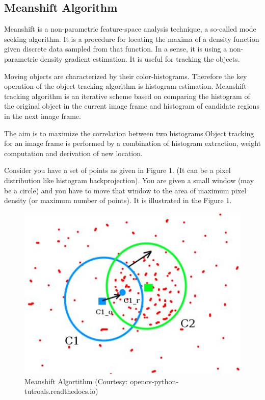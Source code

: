 \documentclass[11pt,a4paper]{article}
\begin{document}
		\subsection{Meanshift Algorithm}
			Meanshift is a non-parametric feature-space analysis technique, a so-called mode seeking algorithm. It is a procedure for locating the maxima of a density function given discrete data sampled from that function. In a sense, it is using a non-parametric density gradient estimation. It is useful for tracking the objects.
			
			Moving objects are characterized by their color-histograms. Therefore the key operation of the object tracking algorithm is histogram estimation. Meanshift tracking algorithm is an iterative scheme based on comparing the histogram of the original object in the current image frame and histogram of candidate regions in the next image frame. 
			 
			The aim is to maximize the correlation between two histograms.Object tracking for an image frame is performed by a combination of histogram extraction, weight computation and derivation of new location. 
			
			Consider you have a set of points as given in Figure 1. (It can be a pixel distribution like histogram backprojection). You are given a small window (may be a circle) and you have to move that window to the area of maximum pixel density (or maximum number of points). It is illustrated in the Figure 1.
			\begin{figure}[h!]
				\includegraphics[scale=0.5 ]{../Images/meanshift.jpg}
				\centering
				\caption{Meanshift Algortithm (Courtesy: opencv-python-tutroals.readthedocs.io)}
			\end{figure}
			
\end{document}
